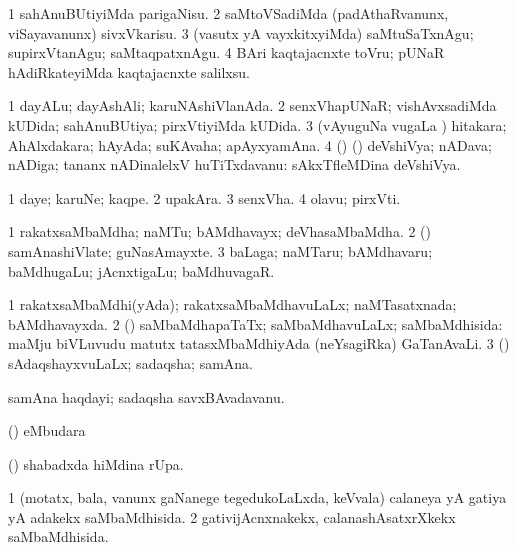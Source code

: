 \noindent
\gl{\pagu}
\bmng
\bnum
\num{1}  sahAnuBUtiyiMda parigaNisu. 
\num{2}  saMtoVSadiMda (padAthaRvanunx, viSayavanunx) sivxVkarisu. 
\num{3}  (vasutx yA vayxkitxyiMda) saMtuSaTxnAgu; supirxVtanAgu; saMtaqpatxnAgu. 
\num{4}  BAri kaqtajacnxte toVru; pUNaR hAdiRkateyiMda kaqtajacnxte salilxsu. 
\enum
\emng
\eentry

\bentry
{}
\gl{\gu}
\bmng
\bnum
\num{1} dayALu; dayAshAli; karuNAshiVlanAda. 
\num{2} senxVhapUNaR; vishAvxsadiMda kUDida; sahAnuBUtiya; pirxVtiyiMda kUDida. 
\num{3} (vAyuguNa \mo vugaLa \vi) hitakara; AhAlxdakara; hAyAda; suKAvaha; apAyxyamAna. 
\num{4} (\pArxparx) (\birx) deVshiVya; nADava; nADiga; tananx nADinalelxV huTiTxdavanu:  sAkxTfleMDina deVshiVya. 
\enum
\emng
\eentry

\bentry
{}
\gl{\nA}
\bmng
\bnum
\num{1} daye; karuNe; kaqpe. 
\num{2} upakAra. 
\num{3} senxVha. 
\num{4} olavu; pirxVti. 
\enum
\emng
\eentry

\bentry
{}
\gl{\nA}
\bmng
\bnum
\num{1} rakatxsaMbaMdha; naMTu; bAMdhavayx; deVhasaMbaMdha. 
\num{2} (\rUpa) samAnashiVlate; guNasAmayxte. 
\num{3} baLaga; naMTaru; bAMdhavaru; baMdhugaLu; jAcnxtigaLu; baMdhuvagaR. 
\enum
\emng
\eentry

\bentry
{}
\gl{\gu}
\bmng
\bnum
\num{1} rakatxsaMbaMdhi(yAda); rakatxsaMbaMdhavuLaLx; naMTasatxnada; bAMdhavayxda. 
\num{2} (\rUpa) saMbaMdhapaTaTx; saMbaMdhavuLaLx; saMbaMdhisida:  maMju biVLuvudu matutx tatasxMbaMdhiyAda (neYsagiRka) GaTanAvaLi. 
\num{3} (\rUpa) sAdaqshayxvuLaLx; sadaqsha; samAna. 
\enum
\emng

\noindent
\gl{\pagu}
\bmng
{}  samAna haqdayi; sadaqsha savxBAvadavanu. 
\emng
\eentry

\bentry
{}
\gl{\nA}
\bmng
(\pArxparx)  eMbudara \bava 
\emng
\eentry

\bentry
{}
\gl{\nA}
\bmng
(\pArxparx)  shabadxda hiMdina rUpa. 
\emng
\eentry

\bentry
{}
\gl{\gu}
\bmng
\bnum
\num{1} (motatx, bala, \mo vanunx gaNanege tegedukoLaLxda, keVvala) calaneya yA gatiya yA adakekx saMbaMdhisida. 
\num{2} gativijAcnxnakekx, calanashAsatxrXkekx saMbaMdhisida. 
\enum
\emng
\eentry

